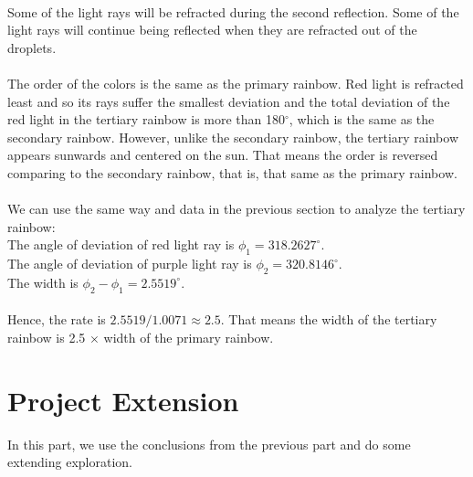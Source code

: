 \documentclass{article}
\begin{document}
\begin{spacing}{1.5}
\\
Some of the light rays will be refracted during the second reflection. Some of the light rays will continue being reflected when they are refracted out of the droplets.\\
\\
The order of the colors is the same as the primary rainbow. Red light is refracted least and so its rays suffer the smallest deviation and the total deviation of the red light in the tertiary rainbow is more than 180$^{\circ}$, which is the same as the secondary rainbow. However, unlike the secondary rainbow, the tertiary rainbow appears sunwards and centered on the sun. \cite{Atoptics} That means the order is reversed comparing to the secondary rainbow, that is, that same as the primary rainbow.\\
\\
We can use the same way and data in the previous section to analyze the tertiary rainbow:\\
\indent \indent The angle of deviation of red light ray is $\phi_{1}=318.2627^{\circ}$.\\
\indent \indent The angle of deviation of purple light ray is $\phi_{2}=320.8146^{\circ}$.\\
\indent \indent The width is $\phi_{2}-\phi_{1}=2.5519^{\circ}$.\\
\\
Hence, the rate is $2.5519/1.0071\approx 2.5$. That means the width of the tertiary rainbow is 2.5 $\times$ width of the primary rainbow.


\section{Project Extension}
In this part, we use the conclusions from the previous part and do some extending exploration.

\end{spacing}
\end{document}

